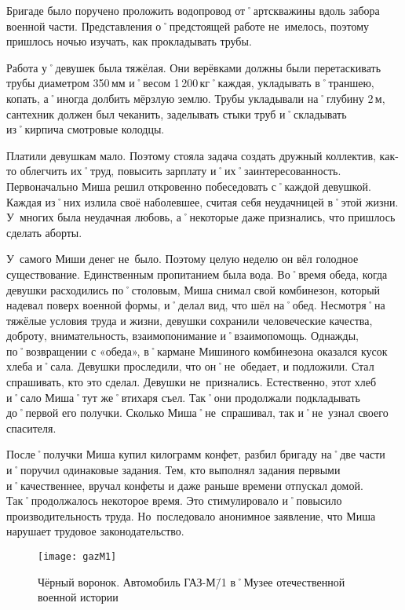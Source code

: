 Бригаде было поручено проложить водопровод от˚артскважины вдоль забора военной части. Представления о˚предстоящей работе не~имелось, поэтому пришлось ночью изучать, как прокладывать трубы.

Работа у˚девушек была тяжёлая. Они верёвками должны были перетаскивать трубы диаметром 350\,мм и˚весом 1\,200\,кг˚каждая, укладывать в˚траншею, копать, а˚иногда долбить мёрзлую землю. Трубы укладывали на˚глубину 2\,м, сантехник должен был чеканить, заделывать стыки труб и˚складывать из˚кирпича смотровые колодцы.

Платили девушкам мало. Поэтому стояла задача создать дружный коллектив, как-то облегчить их˚труд, повысить зарплату и˚их˚заинтересованность. Первоначально Миша решил откровенно побеседовать с˚каждой девушкой. Каждая из˚них излила своё наболевшее, считая себя неудачницей в˚этой жизни. У~многих была неудачная любовь, а˚некоторые даже признались, что пришлось сделать аборты.

У~самого Миши денег не~было. Поэтому целую неделю он вёл голодное существование. Единственным пропитанием была вода. Во˚время обеда, когда девушки расходились по˚столовым, Миша снимал свой комбинезон, который надевал поверх военной формы, и˚делал вид, что шёл на˚обед. Несмотря˚на тяжёлые условия труда и жизни, девушки сохранили человеческие качества, доброту, внимательность, взаимопонимание и˚взаимопомощь. Однажды, по˚возвращении с «обеда», в˚кармане Мишиного комбинезона оказался кусок хлеба и˚сала. Девушки проследили, что он˚не~обедает, и подложили. Стал спрашивать, кто это сделал. Девушки не~признались. Естественно, этот хлеб и˚сало Миша˚тут же˚втихаря съел. Так˚они продолжали подкладывать до˚первой его получки. Сколько Миша˚не~спрашивал, так и˚не~узнал своего спасителя.

После˚получки Миша купил килограмм конфет, разбил бригаду на˚две части и˚поручил одинаковые задания. Тем, кто выполнял задания первыми и˚качественнее, вручал конфеты и даже раньше времени отпускал домой. Так˚продолжалось некоторое время. Это стимулировало и˚повысило производительность труда. Но~последовало анонимное заявление, что Миша нарушает трудовое законодательство.

\begin{wrapfigure}{O}{.4\textwidth}
\centering
\texttt{[image: gazM1]}
\caption[Чёрный воронок. Автомобиль ГАЗ-М\=/1 в˚Музее отечественной военной истории]{Чёрный воронок. Автомобиль ГАЗ-М\=/1 в˚Музее отечественной военной истории\footnotemark}
\label{fig:gazM1}
\end{wrapfigure}

